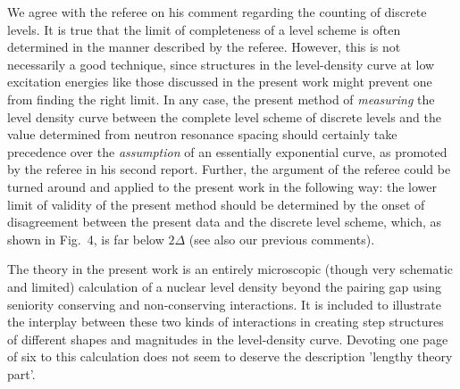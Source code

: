 \documentclass{article}
\begin{document}
We agree with the referee on his comment regarding the counting of discrete 
levels. It is true that the limit of completeness of a level scheme is often 
determined in the manner described by the referee. However, this is not 
necessarily a good technique, since structures in the level-density curve at 
low excitation energies like those discussed in the present work might prevent 
one from finding the right limit. In any case, the present method of 
{\em measuring} the level density curve between the complete level scheme of 
discrete levels and the value determined from neutron resonance spacing should 
certainly take precedence over the {\em assumption} of an essentially 
exponential curve, as promoted by the referee in his second report. Further, 
the argument of the referee could be turned around and applied to the present 
work in the following way: the lower limit of validity of the present method 
should be determined by the onset of disagreement between the present data and 
the discrete level scheme, which, as shown in Fig.\ 4, is far below $2\Delta$ 
(see also our previous comments).

The theory in the present work is an entirely microscopic (though very 
schematic and limited) calculation of a nuclear level density beyond the 
pairing gap using seniority conserving and non-conserving interactions. It is
included to illustrate the interplay between these two kinds of interactions in
creating step structures of different shapes and magnitudes in the 
level-density curve. Devoting one page of six to this calculation does not seem
to deserve the description 'lengthy theory part'.
\end{document}
